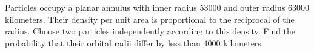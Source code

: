 Particles occupy a planar annulus with inner radius $53000$ and outer radius $63000$ kilometers. Their density per unit area is proportional to the reciprocal of the radius. Choose two particles independently according to this density. Find the probability that their orbital radii differ by less than $4000$ kilometers.
